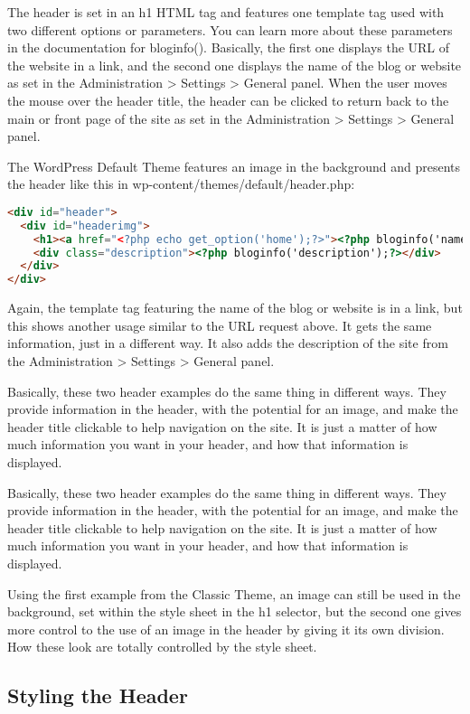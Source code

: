 The header is set in an h1 HTML tag and features one template tag used with two different options or parameters. You can learn more about these parameters in the documentation for bloginfo(). Basically, the first one displays the URL of the website in a link, and the second one displays the name of the blog or website as set in the Administration > Settings > General panel. When the user moves the mouse over the header title, the header can be clicked to return back to the main or front page of the site as set in the Administration > Settings > General panel.

The WordPress Default Theme features an image in the background and presents the header like this in wp-content/themes/default/header.php:

\begin{lstlisting}[language=HTML]
<div id="header">
  <div id="headerimg">
    <h1><a href="<?php echo get_option('home');?>"><?php bloginfo('name');?></a></h1>
    <div class="description"><?php bloginfo('description');?></div>
  </div>
</div>
\end{lstlisting}

Again, the template tag featuring the name of the blog or website is in a link, but this shows another usage similar to the URL request above. It gets the same information, just in a different way. It also adds the description of the site from the Administration > Settings > General panel.

Basically, these two header examples do the same thing in different ways. They provide information in the header, with the potential for an image, and make the header title clickable to help navigation on the site. It is just a matter of how much information you want in your header, and how that information is displayed.

Basically, these two header examples do the same thing in different ways. They provide information in the header, with the potential for an image, and make the header title clickable to help navigation on the site. It is just a matter of how much information you want in your header, and how that information is displayed.

Using the first example from the Classic Theme, an image can still be used in the background, set within the style sheet in the h1 selector, but the second one gives more control to the use of an image in the header by giving it its own division. How these look are totally controlled by the style sheet.


\subsection{Styling the Header}

